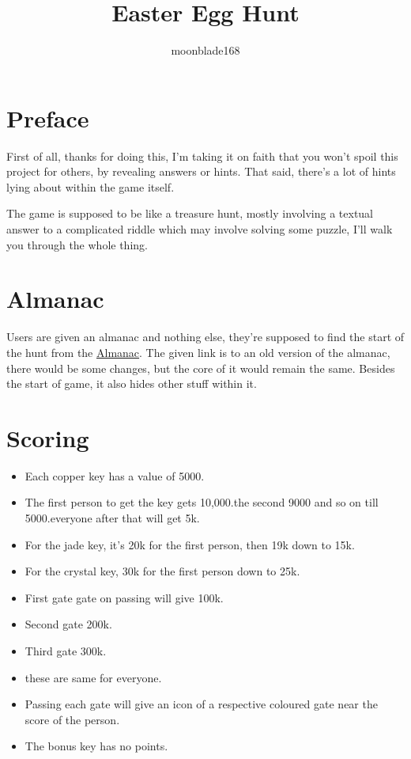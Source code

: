 \documentclass[12pt]{article}
\title{Easter Egg Hunt}
\author{moonblade168}
\begin{document}
\maketitle

\section{Preface}
First of all, thanks for doing this, I'm taking it on faith that you won't spoil this project for others, by revealing answers or hints. That said, there's a lot of hints lying about within the game itself. 

The game is supposed to be like a treasure hunt, mostly involving a textual answer to a complicated riddle which may involve solving some puzzle, I'll walk you through the whole thing.

\section{Almanac}
Users are given an almanac and nothing else, they're supposed to find the start of the hunt from the \href{https://drive.google.com/file/d/0Bw1NE28SnI6_QWNuOEt2SExWUUk/view?usp=sharing}{Almanac}. The given link is to an old version of the almanac, there would be some changes, but the core of it would remain the same. Besides the start of game, it also hides other stuff within it.

\section{Scoring}
\begin{itemize}
\item Each copper key has a value of 5000.
\item The first person to get the key gets 10,000.the second 9000 and so on till 5000.everyone after that will get 5k.
\item For the jade key, it's 20k for the first person, then 19k down to 15k.
\item For the crystal key, 30k for the first person down to 25k.

\item First gate gate on passing will give 100k.
\item Second gate 200k.
\item Third gate 300k.
\item these are same for everyone.
\item Passing each gate will give an icon of a respective coloured gate near the score of the person.

\item The bonus key has no points.
\end{itemize}
\end{document}
